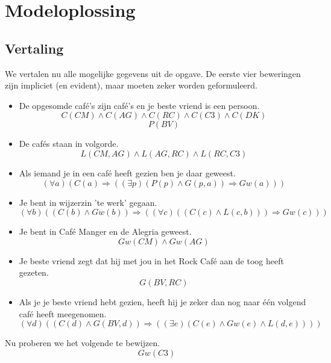 \documentclass[alternative-exam.tex]{subfiles}
\begin{document}
\section{Modeloplossing}
\subsection{Vertaling}
We vertalen nu alle mogelijke gegevens uit de opgave. De eerste vier beweringen zijn impliciet (en evident), maar moeten zeker worden geformuleerd.
\begin{itemize}
\item De opgesomde caf\'e's zijn caf\'e's en je beste vriend is een persoon.
\[ C(CM)\wedge C(AG)\wedge C(RC)\wedge C(C3)\wedge C(DK) \]
\[ P(BV)\]
\item De caf\'es staan in volgorde.
\[
L(CM,AG) \wedge L(AG,RC) \wedge L(RC,C3)
\]
\item Als iemand je in een caf\'e heeft gezien ben je daar geweest.
\[
(\forall a)(C(a) \Rightarrow ((\exists p) (P(p) \wedge G(p,a)) \Rightarrow Gw(a)))
\]
\item Je bent in wijzerzin 'te werk' gegaan.
\[
(\forall b)(( C(b) \wedge Gw(b)) \Rightarrow ((\forall c)(( C(c) \wedge L(c,b)))\Rightarrow Gw(c)))
\]
\item Je bent in Caf\'e Manger en de Alegria geweest.
\[
Gw(CM) \wedge Gw(AG)
\]
\item Je beste vriend zegt dat hij met jou in het Rock Caf\'e aan de toog heeft gezeten.
\[
G(BV,RC)
\]
\item Als je je beste vriend hebt gezien, heeft hij je zeker dan nog naar \'e\'en volgend caf\'e heeft meegenomen.
\[
(\forall d) ((C(d) \wedge G(BV,d)) \Rightarrow ((\exists e) (C(e) \wedge Gw(e) \wedge L(d,e))))
\]
\end{itemize}
Nu proberen we het volgende te bewijzen.
\[
Gw(C3)
\]
\end{document}
